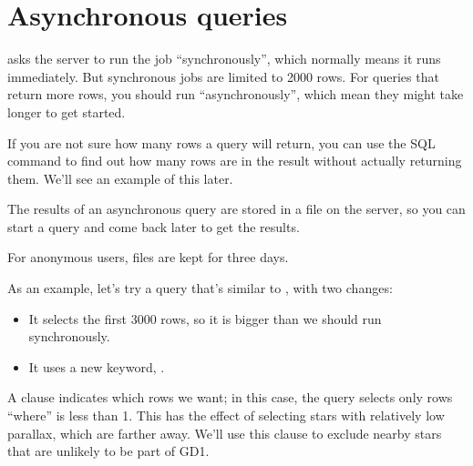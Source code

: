 \documentclass[letterpaper,10pt,english]{sphinxmanual}
\begin{document}
\section{Asynchronous queries}
\label{\detokenize{01_query:asynchronous-queries}}
 asks the server to run the job “synchronously”, which normally means it runs immediately.  But synchronous jobs are limited to 2000 rows.  For queries that return more rows, you should run “asynchronously”, which mean they might take longer to get started.

If you are not sure how many rows a query will return, you can use the SQL command  to find out how many rows are in the result without actually returning them.  We’ll see an example of this later.

The results of an asynchronous query are stored in a file on the server, so you can start a query and come back later to get the results.

For anonymous users, files are kept for three days.

As an example, let’s try a query that’s similar to , with two changes:
\begin{itemize}
\item {} 
It selects the first 3000 rows, so it is bigger than we should run synchronously.

\item {} 
It uses a new keyword, .

\end{itemize}

\begin{sphinxVerbatim}[commandchars=\\\{\}]
  
\end{sphinxVerbatim}

A  clause indicates which rows we want; in this case, the query selects only rows “where”  is less than 1.  This has the effect of selecting stars with relatively low parallax, which are farther away.  We’ll use this clause to exclude nearby stars that are unlikely to be part of GD\sphinxhyphen{}1.
\end{document}

